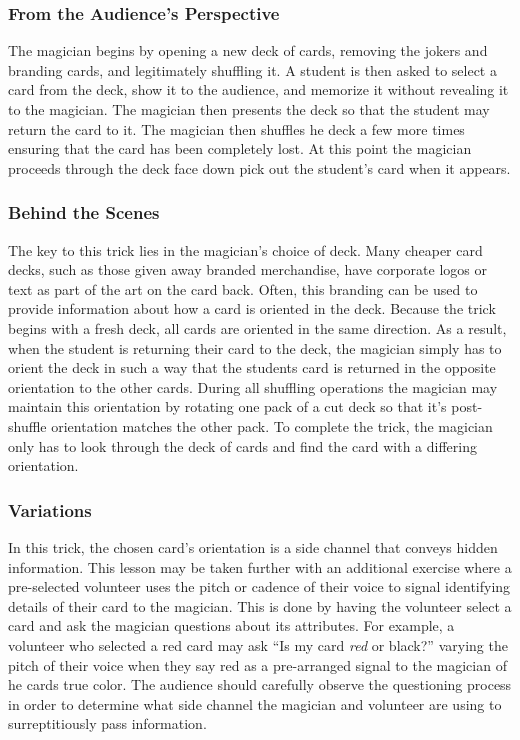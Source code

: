 \subsubsection{From the Audience's Perspective}

The magician begins by opening a new deck of cards, removing the jokers and
branding cards, and legitimately shuffling it.  A student is then asked to
select a card from the deck, show it to the audience, and memorize it without
revealing it to the magician.
The magician then presents the deck so that the student may return
the card to it.
The magician then shuffles he deck a few more times ensuring that the card has
been completely lost.
At this point the magician proceeds through the deck face down pick out the
student's card when it appears.

\subsubsection{Behind the Scenes}

The key to this trick lies in the magician's choice of deck.  Many cheaper card
decks, such as those given away branded merchandise, have corporate logos or
text as part of the art on the card back.  Often, this branding can be used to
provide information about how a card is oriented in the deck.  Because the trick
begins with a fresh deck, all cards are oriented in the same direction.  As a
result, when the student is returning their card to the deck, the magician
simply has to orient the deck in such a way that the students card is returned
in the opposite orientation to the other cards.  During all shuffling
operations the magician may maintain this orientation by rotating one pack of a
cut deck so that it's post-shuffle orientation matches the other pack.
To complete the trick, the magician only has to look through the deck of cards
and find the card with a differing orientation.

\subsubsection{Variations}

In this trick, the chosen card's orientation is a side channel that conveys
hidden information.  This lesson may be taken further with an additional
exercise where a pre-selected volunteer uses the
pitch or cadence of their voice to signal identifying details of their
card to the magician.  This is done by having the volunteer select a card and
ask the magician questions about its attributes.  For example, a volunteer who
selected a red card may
ask ``Is my card \textit{red} or black?'' varying the pitch of their voice when
they say red as a pre-arranged signal to the magician of he cards true color.
The audience should carefully observe the questioning process in order to
determine what side channel the magician and volunteer are using to
surreptitiously pass information.


